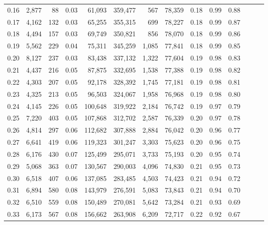 \begin{tabular}{rrrrrrrrrrrrrr}
0.16 &   2,877 &     88 &  0.03 &   61,093 &  359,477 &     567 &  78,359 &  0.18 &  0.99 &      0.88 \\
0.17 &   4,162 &    132 &  0.03 &   65,255 &  355,315 &     699 &  78,227 &  0.18 &  0.99 &      0.87 \\
0.18 &   4,494 &    157 &  0.03 &   69,749 &  350,821 &     856 &  78,070 &  0.18 &  0.99 &      0.86 \\
0.19 &   5,562 &    229 &  0.04 &   75,311 &  345,259 &   1,085 &  77,841 &  0.18 &  0.99 &      0.85 \\
0.20 &   8,127 &    237 &  0.03 &   83,438 &  337,132 &   1,322 &  77,604 &  0.19 &  0.98 &      0.83 \\
0.21 &   4,437 &    216 &  0.05 &   87,875 &  332,695 &   1,538 &  77,388 &  0.19 &  0.98 &      0.82 \\
0.22 &   4,303 &    207 &  0.05 &   92,178 &  328,392 &   1,745 &  77,181 &  0.19 &  0.98 &      0.81 \\
0.23 &   4,325 &    213 &  0.05 &   96,503 &  324,067 &   1,958 &  76,968 &  0.19 &  0.98 &      0.80 \\
0.24 &   4,145 &    226 &  0.05 &  100,648 &  319,922 &   2,184 &  76,742 &  0.19 &  0.97 &      0.79 \\
0.25 &   7,220 &    403 &  0.05 &  107,868 &  312,702 &   2,587 &  76,339 &  0.20 &  0.97 &      0.78 \\
0.26 &   4,814 &    297 &  0.06 &  112,682 &  307,888 &   2,884 &  76,042 &  0.20 &  0.96 &      0.77 \\
0.27 &   6,641 &    419 &  0.06 &  119,323 &  301,247 &   3,303 &  75,623 &  0.20 &  0.96 &      0.75 \\
0.28 &   6,176 &    430 &  0.07 &  125,499 &  295,071 &   3,733 &  75,193 &  0.20 &  0.95 &      0.74 \\
0.29 &   5,068 &    363 &  0.07 &  130,567 &  290,003 &   4,096 &  74,830 &  0.21 &  0.95 &      0.73 \\
0.30 &   6,518 &    407 &  0.06 &  137,085 &  283,485 &   4,503 &  74,423 &  0.21 &  0.94 &      0.72 \\
0.31 &   6,894 &    580 &  0.08 &  143,979 &  276,591 &   5,083 &  73,843 &  0.21 &  0.94 &      0.70 \\
0.32 &   6,510 &    559 &  0.08 &  150,489 &  270,081 &   5,642 &  73,284 &  0.21 &  0.93 &      0.69 \\
0.33 &   6,173 &    567 &  0.08 &  156,662 &  263,908 &   6,209 &  72,717 &  0.22 &  0.92 &      0.67 \\

\end{tabular}
